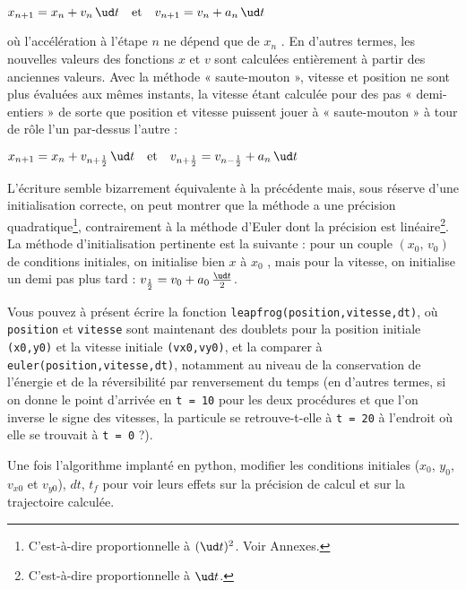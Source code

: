 \begin{center}$x_{n+1} = x_n + v_n\,\ud t \quad \textrm{et} \quad v_{n+1} = v_n + a_n\,\ud t$\end{center}

où l’accélération à l’étape $n$ ne dépend que de $x_n$ . En d’autres termes, les nouvelles valeurs des fonctions $x$ et $v$ sont calculées entièrement à partir des anciennes valeurs. Avec la méthode « saute-mouton », vitesse et position ne sont plus évaluées aux mêmes instants, la vitesse étant calculée pour des pas « demi-entiers » de sorte que position et vitesse puissent jouer à « saute-mouton » à tour de rôle l’un par-dessus l’autre :

\begin{center}$x_{n+1} = x_n + v_{n+\frac{1}{2}}\,\ud t \quad \textrm{et} \quad v_{n+\frac{1}{2}} = v_{n-\frac{1}{2}} + a_n\,\ud t$\end{center}

L’écriture semble bizarrement équivalente à la précédente mais, sous réserve d'une initialisation correcte, on peut montrer que la méthode a une précision quadratique\footnote{C'est-à-dire proportionnelle à $(\ud t)^2$. Voir Annexes.}, contrairement à la méthode d'Euler dont la précision est linéaire\footnote{C'est-à-dire proportionnelle à $\ud t$.}. La méthode d'initialisation pertinente est la suivante : pour un couple $(x_0,\, v_0)$ de conditions initiales, on initialise bien $x$ à $x_0$ , mais pour la vitesse, on initialise un demi pas plus tard : $v_{\frac{1}{2}} = v_0 + a_0\,\frac{\ud t}{2}$.

Vous pouvez à présent écrire la fonction \verb|leapfrog(position,vitesse,dt)|, où \verb|position| et \verb|vitesse| sont maintenant des doublets pour la position initiale \verb|(x0,y0)| et la vitesse initiale \verb|(vx0,vy0)|, et la comparer à \verb|euler(position,vitesse,dt)|, notamment au niveau de la conservation de l’énergie et de la réversibilité par renversement du temps (en d’autres termes, si on donne le point d’arrivée en \verb|t = 10| pour les deux procédures et que l’on inverse le signe des vitesses, la particule se retrouve-t-elle à \verb|t = 20| à l’endroit où elle se trouvait à \verb|t = 0| ?).

Une fois l'algorithme implanté en python, modifier les conditions initiales ($x_0$, $y_0$, $v_{x0}$ et $v_{y0}$), $dt$, $t_f$ pour voir leurs effets sur la précision de calcul et sur la trajectoire calculée.

\vspace{1cm}


